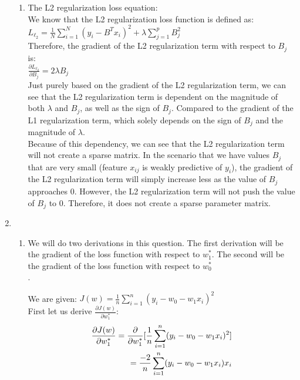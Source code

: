 \documentclass[12pt]{article}
\begin{document}
\begin{enumerate}
\begin{enumerate}
\item The L2 regularization loss equation:  \\ 

We know that the L2 regularization loss function is defined as: \\ $L_{\ell_2} = \frac{1}{N} \sum_{i=1}^{N} (y_i - B^T x_i)^2 + \lambda \sum_{j=1}^{p} B_j^2$ \\
Therefore, the gradient of the L2 regularization term with respect to $B_j$ is: \\ 
$\frac{\partial L_{\ell_2}}{\partial B_j} = 2 \lambda B_j$  \\

Just purely based on the gradient of the L2 regularization term, we can see that the L2 regularization term is dependent on the magnitude of both $\lambda$ and $B_j$, as well as the sign of $B_j$. 
Compared to the gradient of the L1 regularization term, which solely depends on the sign of $B_j$ and the magnitude of $\lambda$. \\ 

Because of this dependency, we can see that the L2 regularization term will not create a sparse matrix. In the scenario that we have 
values $B_j$ that are very small (feature $x_{ij}$ is weakly predictive of $y_i$), the gradient of the L2 regularization term will simply increase less as the value of $B_j$ approaches 0. However, 
the L2 regularization term will not push the value of $B_j$ to 0. Therefore, it does not create a sparse parameter matrix.  
\end{enumerate}

\item
  \begin{enumerate}
  \item We will do two derivations in this question. The first derivation will be the gradient of the loss function with respect to $w^{*}_1$. The second will be the gradient of the loss function 
with respect to $w^{*}_0$ \\. 

    We are given: $J(w) = \frac{1}{n} \sum_{i=1}^{n} (y_i - w_0 - w_1x_i)^2$ \\ 

    First let us derive $\frac{\partial J(w)}{\partial w^{*}_1}$: \\ 
    \begin{align}
      \frac{\partial J(w)}{\partial w^{*}_1} = \frac{\partial}{\partial w^{*}_1} [\frac{1}{n} \sum_{i=1}^{n} (y_i - w_0 - w_1x_i)^2] \notag \\ 
      = \frac{-2}{n} \sum_{i=1}^{n} (y_i - w_0 - w_1x_i)x_i \notag 
    \end{align}


\end{enumerate}
\end{enumerate}
\end{document}
